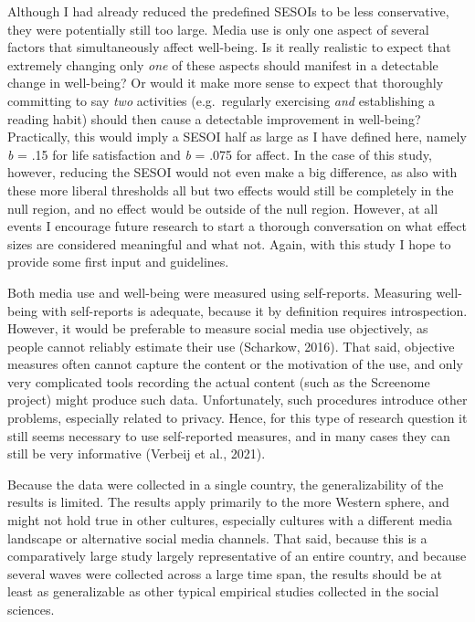 \documentclass[
  man,mask]{apa7}
\begin{document}
Although I had already reduced the predefined SESOIs to be less conservative, they were potentially still too large.
Media use is only one aspect of several factors that simultaneously affect well-being.
Is it really realistic to expect that extremely changing only \emph{one} of these aspects should manifest in a detectable change in well-being?
Or would it make more sense to expect that thoroughly committing to say \emph{two} activities (e.g.~regularly exercising \emph{and} establishing a reading habit) should then cause a detectable improvement in well-being?
Practically, this would imply a SESOI half as large as I have defined here, namely \emph{b} = \textbar.15\textbar{} for life satisfaction and \emph{b} = \textbar.075\textbar{} for affect.
In the case of this study, however, reducing the SESOI would not even make a big difference, as also with these more liberal thresholds all but two effects would still be completely in the null region, and no effect would be outside of the null region.
However, at all events I encourage future research to start a thorough conversation on what effect sizes are considered meaningful and what not.
Again, with this study I hope to provide some first input and guidelines.

Both media use and well-being were measured using self-reports.
Measuring well-being with self-reports is adequate, because it by definition requires introspection.
However, it would be preferable to measure social media use objectively, as people cannot reliably estimate their use (Scharkow, 2016).
That said, objective measures often cannot capture the content or the motivation of the use, and only very complicated tools recording the actual content (such as the Screenome project) might produce such data.
Unfortunately, such procedures introduce other problems, especially related to privacy.
Hence, for this type of research question it still seems necessary to use self-reported measures, and in many cases they can still be very informative (Verbeij et al., 2021).

Because the data were collected in a single country, the generalizability of the results is limited.
The results apply primarily to the more Western sphere, and might not hold true in other cultures, especially cultures with a different media landscape or alternative social media channels.
That said, because this is a comparatively large study largely representative of an entire country, and because several waves were collected across a large time span, the results should be at least as generalizable as other typical empirical studies collected in the social sciences.
\end{document}
